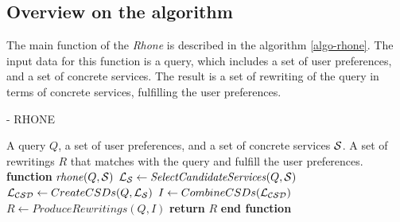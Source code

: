
\subsection{Overview on the algorithm}
The main function of the \textit{Rhone} is described in the algorithm
\ref{algo-rhone}.
The input data for this function is a query, which includes a set of user preferences, and a set of concrete services. The result is a set of rewriting of the query in terms of concrete services, fulfilling the user preferences.

\begin{algorithm}
\small
\caption{ - RHONE}
\label{algo-rhone}
\begin{algorithmic}[1]
\REQUIRE A query $Q$, a set of user preferences, and a set of concrete services $\hbox{${\cal S}$}$.
\ENSURE A set of rewritings $R$ that matches with the query and fulfill the user preferences.
\STATE \textbf{function} $\mathit{rhone} (Q, \hbox{${\cal S}$})$
 \STATE  $\hbox{${\cal L_{S}}$} \leftarrow \mathit{SelectCandidateServices}(Q, \hbox{${\cal S}$})$ \label{rhone:buildPCD}
 \STATE  $\hbox{${\cal L_{CSD}}$} \leftarrow CreateCSDs(Q, \hbox{${\cal L_{S}}$})$
 \STATE  $I \leftarrow CombineCSDs(\hbox{${\cal L_{CSD}}$})$
 \STATE $R\leftarrow ProduceRewritings(Q, I)$
    \STATE \textbf{return} $R$
\STATE \textbf{end function}
\end{algorithmic}
\end{algorithm}

